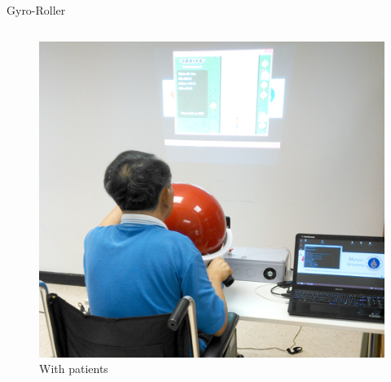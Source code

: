 \documentclass[10pt]{beamer}
\begin{document}
\begin{frame}{Gyro-Roller}
\begin{columns}[c]
\begin{figure}[h]
			\includegraphics[width=\textwidth]{patient2}
			\caption{With patients}
		\end{figure}
	\end{columns}
\end{frame}
\end{document}

